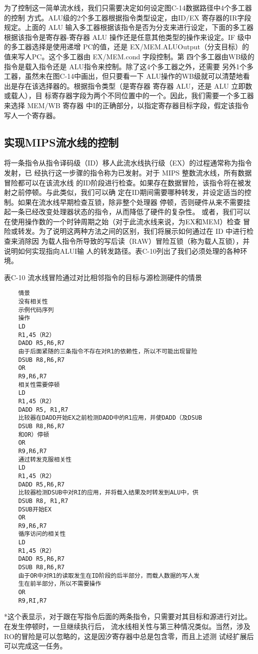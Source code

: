 为了控制这一简单流水线，我们只需要决定如何设定图C-14数据路径中4个多工器的控制
方式。ALU级的2个多工器根据指令类型设定，由ID/EX 寄存器的IR字段规定。上面的 ALU
输入多工器根据该指令是否为分支来进行设定，下面的多工器根据该指令是寄存器-寄存器
ALU 操作还是任意其他类型的操作来设定。IF 级中的多工器选择是使用递增 PC的值，还是
EX/MEM.ALUOutput（分支目标）的值来写人PC。这个多工器由 EX/MEM.cond 字段控制。第
四个多工器由WB级的指令是载入指令还是 ALU指令来控制。除了这4个多工器之外，还需要
另外1个多工器，虽然未在图C-14中画出，但只要看一下 ALU操作的WB级就可以清楚地看
出是存在该选择器的。根据指令类型（是寄存器 寄存器 ALU，还是 ALU 立即数或载人），目
标寄存器字段为两个不同位置中的一个。因此，我们需要一个多工器来选择 MEM/WB 寄存器
中I的正确部分，以指定寄存器目标字段，假定该指令写人一个寄存器。

\subsection{实现MIPS流水线的控制}

将一条指令从指令译码级（ID）移人此流水线执行级（EX）的过程通常称为指令发射，已
经执行这一步骤的指令称为已发射。对于 MIPS 整数流水线，所有数据冒险都可以在该流水线
的ID阶段进行检查。如果存在数据冒险，该指令将在被发射之前停顿。与此类似，我们可以确
定在ID期间需要哪种转发，并设定适当的控制。如果在流水线早期检查互锁，除非整个处理器
停顿，否则硬件从来不需要挂起一条已经改变处理器状态的指令，从而降低了硬件的复杂性。
或者，我们可以在使用操作数的一个时钟周期之始（对于此流水线来说，为EX和MEM）检查
冒险或转发。为了说明这两种方法之间的区别，我们将展示如何通过在 ID 中进行检查来消除因
为载人指令所导致的写后读（RAW）冒险互锁（称为载人互锁），并说明如何实现指向ALUI输
人的转发路径。表C-10列出了我们必须处理的各种环境。

表C-10 流水线冒险通过对比相邻指令的目标与源检测硬件的情景
\begin{verbatim}
    情景
    没有相关性
    示例代码序列
    操作
    LD
    R1,45（R2）
    DADD R5,R6,R7
    由于后面紧随的三条指令不存在对R1的依赖性，所以不可能出现冒险
    DSUB R8,R6,R7
    OR
    R9,R6,R7
    相关性需要停顿
    LD
    R1,45（R2）
    DADD R5, R1,R7
    比较器在DADD开始EX之前检测DADD中的R1应用，并使DADD（及DSUB
    DSUB R8,R6,R7
    和OR）停顿
    OR
    R9,R6,R7
    通过转发克服相关性
    LD
    R1,45（R2）
    DADD R5,R6,R7
    比较器检测DSUB中对RI的应用，并将载入结果及时转发到ALU中，供
    DSUB R8, R1,R7
    DSUB开始EX
    OR
    R9,R6,R7
    循序访问的相关性
    LD
    R1,45（R2）
    DADD R5,R6,R7
    DSUB R8,R6,R7
    由于OR中对R1的读取发生在ID阶段的后半部分，而载人数据的写人发
    生在前半部分，所以不需要操作
    OR
    R9,RI,R7
\end{verbatim}
*这个表显示，对于跟在写指令后面的两条指令，只需要对其目标和源进行对比。在发生停顿时，一旦继续执行后，
流水线相关性与第三种情况类似。当然，涉及 RO的冒险是可以忽略的，这是因汐寄存器中总是包含零，而且上述测
试经扩展后可以完成这一任务。

